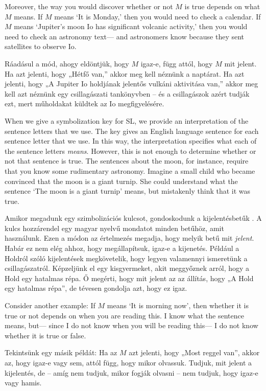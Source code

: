 Moreover, the way you would discover whether or not $M$ is true depends on what $M$ means. If $M$ means `It is Monday,' then you would need to check a calendar. If $M$ means `Jupiter's moon Io has significant volcanic activity,' then you would need to check an astronomy text--- and astronomers know because they sent satellites to observe Io.

Ráadásul a mód, ahogy eldöntjük, hogy $M$ igaz-e, függ attól, hogy $M$ mit jelent. Ha azt jelenti, hogy „Hétfő van,” akkor meg kell néznünk a naptárat. Ha azt jelenti, hogy „A Jupiter Io holdjának jelentős vulkáni aktivitása van,” akkor meg kell azt néznünk egy csillagászati tankönyvben -- és a csillagászok azért tudják ezt, mert műholdakat küldtek az Io megfigyelésére.

When we give a symbolization key for SL, we provide an {interpretation} of the sentence letters that we use. The key gives an English language sentence for each sentence letter that we use. In this way, the interpretation specifies what each of the sentence letters \emph{means}. However, this is not enough to determine whether or not that sentence is true. The sentences about the moon, for instance, require that you know some rudimentary astronomy. Imagine a small child who became convinced that the moon is a giant turnip. She could understand what the sentence `The moon is a giant turnip' means, but mistakenly think that it was true.

Amikor megadunk egy szimbolizációs kulcsot, gondoskodunk a kijelentésbetűk . A kulcs hozzárendel egy magyar nyelvű mondatot minden betűhöz, amit használunk. Ezen a módon az értelmezés megadja, hogy melyik betű mit \emph{jelent}. Habár ez nem elég ahhoz, hogy megállapítsuk, igaz-e a kijenetés. Például a Holdról szóló kijelentések megkövetelik, hogy legyen valamennyi ismeretünk a csillagászatról. Képzeljünk el egy kisgyermeket, akit meggyőznek arról, hogy a Hold egy hatalmas répa. Ő megérti, hogy mit jelent az az állítás, hogy „A Hold egy hatalmas répa”, de tévesen gondolja azt, hogy ez igaz.

Consider another example: If $M$ means `It is morning now', then whether it is true or not depends on when you are reading this. I know what the sentence means, but--- since I do not know when you will be reading this--- I do not know whether it is true or false.

Tekintsünk egy másik példát: Ha az $M$ azt jelenti, hogy „Most reggel van”, akkor az, hogy igaz-e vagy sem, attól függ, hogy mikor olvassuk. Tudjuk, mit jelent a kijelentés, de -- amíg nem tudjuk, mikor fogják olvasni -- nem tudjuk, hogy igaz-e vagy hamis.


